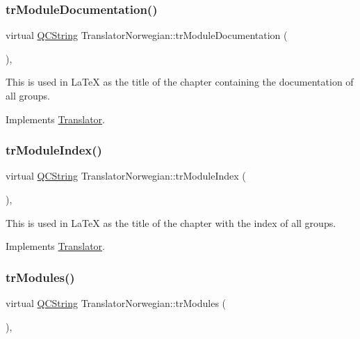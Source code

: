 \subsubsection{\texorpdfstring{trModuleDocumentation()}{trModuleDocumentation()}}
{\footnotesize\ttfamily virtual \mbox{\hyperlink{class_q_c_string}{Q\+C\+String}} Translator\+Norwegian\+::tr\+Module\+Documentation (\begin{DoxyParamCaption}{ }\end{DoxyParamCaption})\hspace{0.3cm}{\ttfamily [inline]}, {\ttfamily [virtual]}}

This is used in La\+TeX as the title of the chapter containing the documentation of all groups. 

Implements \mbox{\hyperlink{class_translator}{Translator}}.

\mbox{\label{class_translator_norwegian_a59ac28b655bef6be63d1031aa8716eb6}} 
\subsubsection{\texorpdfstring{trModuleIndex()}{trModuleIndex()}}
{\footnotesize\ttfamily virtual \mbox{\hyperlink{class_q_c_string}{Q\+C\+String}} Translator\+Norwegian\+::tr\+Module\+Index (\begin{DoxyParamCaption}{ }\end{DoxyParamCaption})\hspace{0.3cm}{\ttfamily [inline]}, {\ttfamily [virtual]}}

This is used in La\+TeX as the title of the chapter with the index of all groups. 

Implements \mbox{\hyperlink{class_translator}{Translator}}.

\mbox{\label{class_translator_norwegian_af296fbd95136709a9c6d0f0a3000598d}} 
\subsubsection{\texorpdfstring{trModules()}{trModules()}}
{\footnotesize\ttfamily virtual \mbox{\hyperlink{class_q_c_string}{Q\+C\+String}} Translator\+Norwegian\+::tr\+Modules (\begin{DoxyParamCaption}{ }\end{DoxyParamCaption})\hspace{0.3cm}{\ttfamily [inline]}, {\ttfamily [virtual]}}

